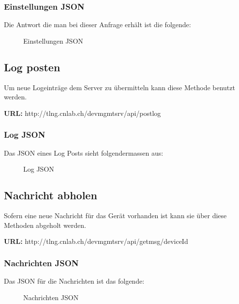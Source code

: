 \pagebreak
\subsubsection{Einstellungen JSON}

Die Antwort die man bei dieser Anfrage erhält ist die folgende:

\begin{figure}[H]
	\centering
	
	\caption{Einstellungen JSON}
\end{figure}


\subsection{Log posten}

Um neue Logeinträge dem Server zu übermitteln kann diese Methode benutzt werden.

{\bf URL: }http://tlng.cnlab.ch/devmgmtsrv/api/postlog

\subsubsection{Log JSON}

Das JSON eines Log Posts sieht folgendermassen aus:

\begin{figure}[H]
	\centering
	
	\caption{Log JSON}
\end{figure}

\subsection{Nachricht abholen}

Sofern eine neue Nachricht für das Gerät vorhanden ist kann sie über diese Methoden abgeholt werden.

{\bf URL: }http://tlng.cnlab.ch/devmgmtsrv/api/getmsg/{deviceId}

\subsubsection{Nachrichten JSON}
Das JSON für die Nachrichten ist das folgende:
\begin{figure}[H]
	\centering
	
	\caption{Nachrichten JSON}
\end{figure}


